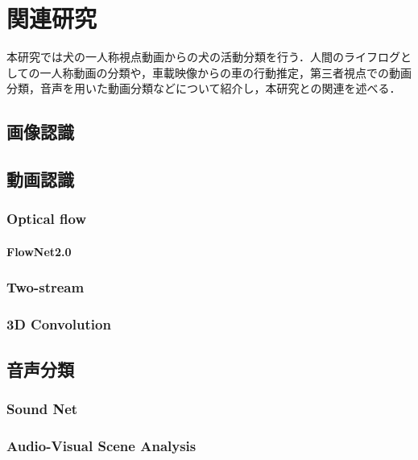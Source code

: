 \chapter{関連研究}
本研究では犬の一人称視点動画からの犬の活動分類を行う．人間のライフログとしての一人称動画の分類や，車載映像からの車の行動推定，第三者視点での動画分類，音声を用いた動画分類などについて紹介し，本研究との関連を述べる．
\section{画像認識}
\section{動画認識}
\subsection{Optical flow}
\subsubsection{FlowNet2.0}
\subsection{Two-stream}
\subsection{3D Convolution}
\section{音声分類}
\subsection{Sound Net}
\subsection{Audio-Visual Scene Analysis}
